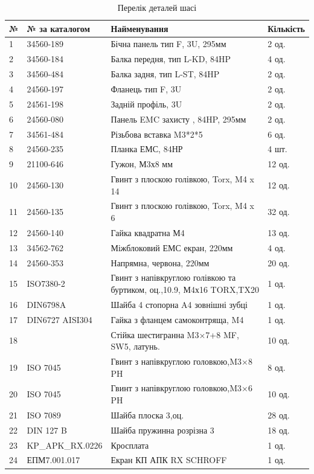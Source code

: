 \begin{table}[H]
    \centering
  \caption{Перелік деталей шасі}
    \begin{tabular}{|p{0.8cm}|p{3.2cm}|p{7.5cm}|p{2cm}|} 
        \hline
        \textbf{№} & \textbf{№ за каталогом} & \textbf{Найменування} & \textbf{Кількість} \\ \hline
        1 & 34560-189 & Бічна панель тип F, 3U, 295мм  & 2 од. \\ \hline
        2 & 34560-184 & Балка передня, тип L-KD, 84HP & 4 од. \\ \hline
        3 & 34560-484 & Балка задня, тип L-ST, 84HP & 2 од. \\ \hline
        4 & 24560-197 & Фланець тип F, 3U & 2 од. \\ \hline
        5 & 24561-198 & Задній профіль, 3U & 2 од. \\ \hline
        6 & 24560-080 & Панель EMC захисту , 84HP, 295мм & 2 од. \\ \hline
        7 & 34561-484 & Різьбова вставка M3*2*5 & 6 од. \\ \hline
        8 & 24560-235 & Планка ЕМС, 84НР & 4 шт. \\ \hline
        9 & 21100-646 & Гужон, М3х8 мм & 12 од. \\ \hline
       10 & 24560-130 & Гвинт з плоскою голівкою, Torx, M4 x 14 & 12 од. \\ \hline
       11 & 24560-135 & Гвинт з плоскою голівкою, Torx, M4 x 6 & 32 од. \\ \hline
       12 & 24560-140 & Гайка квадратна М4 & 13 од. \\ \hline
       13 & 34562-762 & Міжблоковий ЕМС екран, 220мм & 4 од. \\ \hline
       14 & 24560-353 & Напрямна, червона, 220мм & 20 од. \\ \hline
       15 & ISO7380-2 & Гвинт з напівкруглою голівкою та буртиком, оц.,10.9, М4х16 TORX,TX20 & 1 од. \\ \hline
       16 & DIN6798A & Шайба 4 стопорна A4 зовнішні зубці & 1 од. \\ \hline
       17 & DIN6727 AISI304 & Гайка з фланцем самоконтряща, M4 & 1 од. \\ \hline
       18 &  & Стійка шестигранна M3×7+8 MF, SW5, латунь. & 10 од. \\ \hline
       19 & ISO 7045 & Гвинт з напівкруглою головкою,M3×8 PH & 8 од. \\ \hline
       20 & ISO 7045 & Гвинт з напівкруглою головкою,M3×6 PH & 10 од. \\ \hline
       21 & ISO 7089 & Шайба плоска 3,оц. & 28 од. \\ \hline
       22 & DIN 127 B & Шайба пружинна розрізна 3 & 18 од. \\ \hline
       23 & KP_APK_RX.0226 & Кросплата & 1 од. \\ \hline
       24 & ЕПМ7.001.017 & Екран КП АПК RX SCHROFF & 1 од. \\ \hline
   
    \end{tabular}
    
\end{table}


